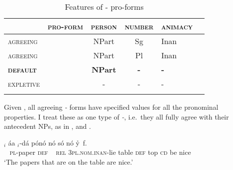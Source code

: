 \documentclass[output=paper]{LSP/langsci}
\begin{document}
 
\begin{table}[h]
 	\caption{Features of \textit{\eer}- pro-forms}
 	\label{tab:korsah:2}
 	\centering
 	\begin{tabular}{lccc p{2cm} c}
  \lsptoprule
 		
 		&\textsc{pro-form}& \textsc{person} & \textsc{number}  & \textsc{animacy}   \\
 		\hline
 		\textsc{agreeing} &\eer & NPart & Sg & Inan  \\
 		\textsc{agreeing}&	\eer & NPart & Pl  & Inan \\
 		
 		\textbf{\textsc{default}}&	\textbf{\eer}&	\textbf{NPart} 	&	\textbf{-} & 	\textbf{-}  \\
 		
 		\textsc{expletive}& 	\eer& - 	&- & -   \\
 	 \lsptoprule
 		
 	\end{tabular}
 	
 \end{table}
 
 


  
Given , all agreeing \textit{\eer-} forms have specified values for all the pronominal properties. I treat these as one type of \textit{\eer-}, i.e.\ they all fully agree with their antecedent NPs, as in , and .
  
\ea\label{ex:korsah:23} 
\gll [ N-k{\'{r}}ata{\'{a}} n{\'{o}} ]$_i$  {\'{a}}a  \eer$_i$-d{\'{a}} p{\'{o}}n{\'{o}} n{\'{o}} s{\'{o}}  n{\'{o}} y\h \eer \, f\eer.\\
~ \textsc{pl-}paper  \textsc{def} ~ \textsc{rel} \textsc{3pl.nom.inan}-lie table \textsc{def} top \textsc{cd} be nice \\
\glt  `The papers that are on the table are nice.'

\z
\end{document}

